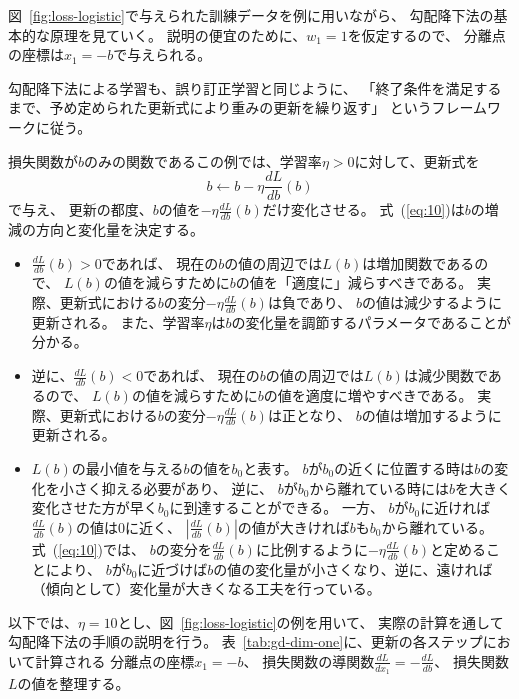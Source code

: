図~\ref{fig:loss-logistic}で与えられた訓練データを例に用いながら、
勾配降下法の基本的な原理を見ていく。
説明の便宜のために、$w_1 = 1$を仮定するので、
分離点の座標は$x_1 = -b$で与えられる。

勾配降下法による学習も、誤り訂正学習と同じように、
「終了条件を満足するまで、予め定められた更新式により重みの更新を繰り返す」
というフレームワークに従う。

損失関数が$b$のみの関数であるこの例では、学習率$\eta > 0$に対して、更新式を
\begin{equation}\label{eq:10}
  b \leftarrow b - \eta \frac{dL}{db}(b)
\end{equation}
で与え、
更新の都度、$b$の値を$-\eta \frac{dL}{db}(b)$だけ変化させる。
式~(\ref{eq:10})は$b$の増減の方向と変化量を決定する。
\begin{itemize}
\item $\frac{dL}{db}(b) > 0$であれば、
  現在の$b$の値の周辺では$L(b)$は増加関数であるので、
  $L(b)$の値を減らすために$b$の値を「適度に」減らすべきである。
  実際、更新式における$b$の変分$-\eta\frac{dL}{db}(b)$は負であり、
  $b$の値は減少するように更新される。
  また、学習率$\eta$は$b$の変化量を調節するパラメータであることが分かる。
\item
  逆に、$\frac{dL}{db}(b) < 0$であれば、
  現在の$b$の値の周辺では$L(b)$は減少関数であるので、
  $L(b)$の値を減らすために$b$の値を適度に増やすべきである。
  実際、更新式における$b$の変分$-\eta\frac{dL}{db}(b)$は正となり、
  $b$の値は増加するように更新される。
\item $L(b)$の最小値を与える$b$の値を$b_0$と表す。
  $b$が$b_0$の近くに位置する時は$b$の変化を小さく抑える必要があり、
  逆に、
  $b$が$b_0$から離れている時には$b$を大きく変化させた方が早く$b_0$に到達することができる。
  一方、
  $b$が$b_0$に近ければ$\frac{dL}{db}(b)$の値は0に近く、
  $\left\vert\frac{dL}{db}(b)\right\vert$の値が大きければ$b$も$b_0$から離れている。
  式~(\ref{eq:10})では、
  $b$の変分を$\frac{dL}{db}(b)$に比例するように$-\eta\frac{dL}{db}(b)$と定めることにより、
  $b$が$b_0$に近づけば$b$の値の変化量が小さくなり、逆に、遠ければ（傾向として）変化量が大きくなる工夫を行っている。
\end{itemize}

以下では、$\eta = 10$とし、図~\ref{fig:loss-logistic}の例を用いて、
実際の計算を通して勾配降下法の手順の説明を行う。
表~\ref{tab:gd-dim-one}に、更新の各ステップにおいて計算される
分離点の座標$x_1 = -b$、
損失関数の導関数$\frac{dL}{dx_1} = -\frac{dL}{db}$、
損失関数$L$の値を整理する。

